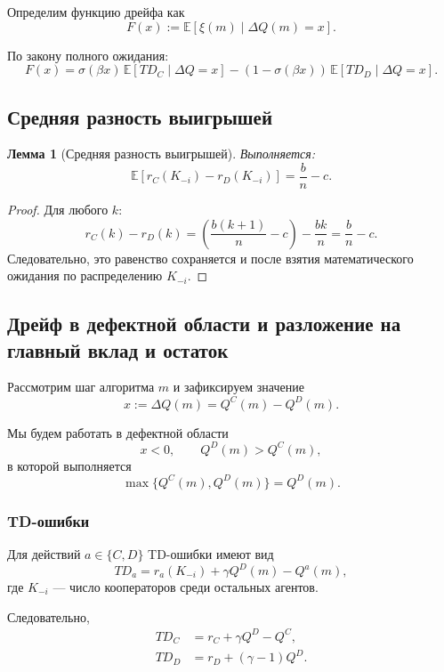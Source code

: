 \documentclass[12pt,a4paper]{article}
\newtheorem{lemma}{Лемма}
\theoremstyle{definition}
\begin{document}
Определим функцию дрейфа как
\[
F(x)
:=
\mathbb E\!\left[
\xi(m)\mid \Delta Q(m)=x
\right].
\]

По закону полного ожидания:
\[
F(x)
=
\sigma(\beta x)\,\mathbb E[TD_C\mid \Delta Q=x]
-
(1-\sigma(\beta x))\,\mathbb E[TD_D\mid \Delta Q=x].
\]

\subsection{Средняя разность выигрышей}

\begin{lemma}[Средняя разность выигрышей]
Выполняется:
\[
\mathbb E\!\left[r_C(K_{-i})-r_D(K_{-i})\right]
=
\frac{b}{n}-c.
\]
\end{lemma}

\begin{proof}
Для любого $k$:
\[
r_C(k)-r_D(k)
=
\left(\frac{b(k+1)}{n}-c\right)-\frac{bk}{n}
=
\frac{b}{n}-c.
\]
Следовательно, это равенство сохраняется и после взятия
математического ожидания по распределению $K_{-i}$.
\end{proof}

\subsection{Дрейф в дефектной области и разложение на главный вклад и остаток}

Рассмотрим шаг алгоритма $m$ и зафиксируем значение
\[
x := \Delta Q(m) = Q^C(m) - Q^D(m).
\]

Мы будем работать в дефектной области
\[
x<0,
\qquad
Q^D(m) > Q^C(m),
\]
в которой выполняется
\[
\max\{Q^C(m),Q^D(m)\} = Q^D(m).
\]

\subsubsection{TD-ошибки}

Для действий $a\in\{C,D\}$ TD-ошибки имеют вид
\[
TD_a
=
r_a(K_{-i})
+
\gamma Q^D(m)
-
Q^a(m),
\]
где $K_{-i}$ — число кооператоров среди остальных агентов.

Следовательно,
\begin{align}
TD_C
&=
r_C
+
\gamma Q^D
-
Q^C,
\label{eq:TD_C}\\
TD_D
&=
r_D
+
(\gamma-1)Q^D.
\label{eq:TD_D}
\end{align}
\end{document}
